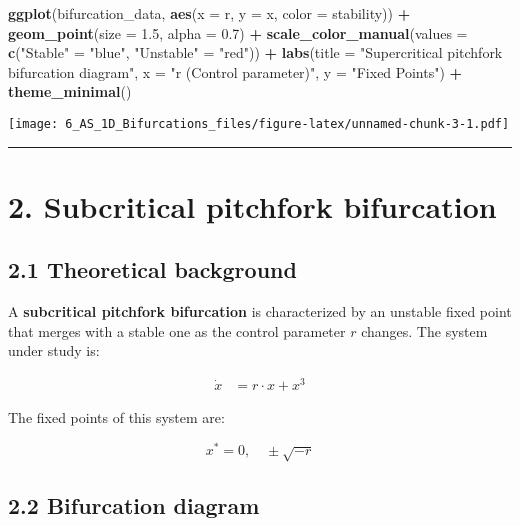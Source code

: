 \documentclass[
]{article}
\newenvironment{Shaded}{\begin{snugshade}}{\end{snugshade}}
\newcommand{\AttributeTok}[1]{\textcolor[rgb]{0.13,0.29,0.53}{#1}}
\newcommand{\FloatTok}[1]{\textcolor[rgb]{0.00,0.00,0.81}{#1}}
\newcommand{\FunctionTok}[1]{\textcolor[rgb]{0.13,0.29,0.53}{\textbf{#1}}}
\newcommand{\NormalTok}[1]{#1}
\newcommand{\OtherTok}[1]{\textcolor[rgb]{0.56,0.35,0.01}{#1}}
\newcommand{\SpecialCharTok}[1]{\textcolor[rgb]{0.81,0.36,0.00}{\textbf{#1}}}
\newcommand{\StringTok}[1]{\textcolor[rgb]{0.31,0.60,0.02}{#1}}
\begin{document}
\begin{Shaded}
\begin{Highlighting}[]
\FunctionTok{ggplot}\NormalTok{(bifurcation\_data, }\FunctionTok{aes}\NormalTok{(}\AttributeTok{x =}\NormalTok{ r, }\AttributeTok{y =}\NormalTok{ x, }\AttributeTok{color =}\NormalTok{ stability)) }\SpecialCharTok{+}
  \FunctionTok{geom\_point}\NormalTok{(}\AttributeTok{size =} \FloatTok{1.5}\NormalTok{, }\AttributeTok{alpha =} \FloatTok{0.7}\NormalTok{) }\SpecialCharTok{+}
  \FunctionTok{scale\_color\_manual}\NormalTok{(}\AttributeTok{values =} \FunctionTok{c}\NormalTok{(}\StringTok{"Stable"} \OtherTok{=} \StringTok{"blue"}\NormalTok{, }\StringTok{"Unstable"} \OtherTok{=} \StringTok{"red"}\NormalTok{)) }\SpecialCharTok{+}
  \FunctionTok{labs}\NormalTok{(}\AttributeTok{title =} \StringTok{"Supercritical pitchfork bifurcation diagram"}\NormalTok{,}
       \AttributeTok{x =} \StringTok{"r (Control parameter)"}\NormalTok{, }\AttributeTok{y =} \StringTok{"Fixed Points"}\NormalTok{) }\SpecialCharTok{+}
  \FunctionTok{theme\_minimal}\NormalTok{()}
\end{Highlighting}
\end{Shaded}

\texttt{[image: 6\_AS\_1D\_Bifurcations\_files/figure-latex/unnamed-chunk-3-1.pdf]}

\begin{center}\rule{0.5\linewidth}{0.5pt}\end{center}

\section{2. Subcritical pitchfork
bifurcation}\label{subcritical-pitchfork-bifurcation}

\subsection{\texorpdfstring{\textbf{2.1 Theoretical
background}}{2.1 Theoretical background}}\label{theoretical-background-1}

A \textbf{subcritical pitchfork bifurcation} is characterized by an
unstable fixed point that merges with a stable one as the control
parameter \(r\) changes. The system under study is:

\[
\begin{aligned}
\dot{x} &= r \cdot x + x^3
\end{aligned}
\]

The fixed points of this system are:

\[
x^* = 0, \quad \pm\sqrt{-r}
\]

\subsection{\texorpdfstring{\textbf{2.2 Bifurcation
diagram}}{2.2 Bifurcation diagram}}\label{bifurcation-diagram-1}
\end{document}
